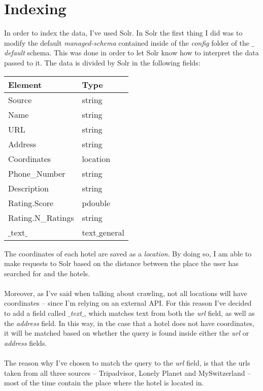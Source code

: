 \documentclass[unicode,11pt,a4paper,oneside,numbers=endperiod,openany]{scrartcl}
\begin{document}
\section{Indexing}
In order to index the data, I've used Solr. In Solr the first thing I did was to modify the default \textit{managed-schema} contained inside of the \textit{config} folder of the \textit{$\_$default} schema. This was done in order to let Solr know how to interpret the data passed to it. The data is divided by Solr in the following fields:

\begin{table}[H]
	\centering
	\begin{tabular}{|l|l|} \hline 
		\textbf{Element} & \textbf{Type}  \\ \hline
		Source & string \\
		Name & string \\
		URL & string \\
		Address & string \\
		Coordinates & location \\
		Phone\_Number & string \\
		Description & string \\
		Rating.Score & pdouble \\
		Rating.N\_Ratings & string \\
		$\_$text$\_$ & text$\_$general \\
		\hline
	\end{tabular}
\end{table}
\noindent The coordinates of each hotel are saved as a \textit{location}. By doing so, I am able to make requests to Solr based on the distance between the place the user has searched for and the hotels. \\ \\
Moreover, as I've said when talking about crawling, not all locations will have coordinates -- since I'm relying on an external API. For this reason I've decided to add a field called \textit{$\_$text$\_$}, which matches text from both the \textit{url} field, as well as the \textit{address} field. In this way, in the case that a hotel does not have coordinates, it will be matched based on whether the query is found inside either the \textit{url} or \textit{address} fields. \\ \\
The reason why I've chosen to match the query to the \textit{url} field, is that the urls taken from all three sources -- Tripadvisor, Lonely Planet and MySwitzerland -- most of the time contain the place where the hotel is located in.
\end{document}
